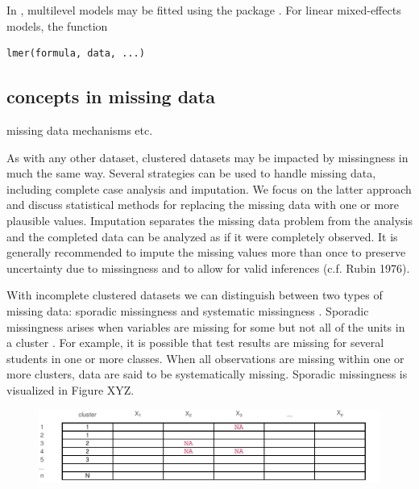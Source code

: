 \documentclass[
  article]{jss}
\begin{document}
In , multilevel models may be fitted using the package
. For linear mixed-effects models, the function

\begin{verbatim}
lmer(formula, data, ...)
\end{verbatim}

\hypertarget{concepts-in-missing-data}{%
\subsection{concepts in missing data}\label{concepts-in-missing-data}}

missing data mechanisms etc.

As with any other dataset, clustered datasets may be impacted by
missingness in much the same way. Several strategies can be used to
handle missing data, including complete case analysis and imputation. We
focus on the latter approach and discuss statistical methods for
replacing the missing data with one or more plausible values. Imputation
separates the missing data problem from the analysis and the completed
data can be analyzed as if it were completely observed. It is generally
recommended to impute the missing values more than once to preserve
uncertainty due to missingness and to allow for valid inferences (c.f.
Rubin 1976).

With incomplete clustered datasets we can distinguish between two types
of missing data: sporadic missingness and systematic missingness
\citep{resc13}. Sporadic missingness arises when variables are missing
for some but not all of the units in a cluster \citep{buur18, jola18}.
For example, it is possible that test results are missing for several
students in one or more classes. When all observations are missing
within one or more clusters, data are said to be systematically missing.
Sporadic missingness is visualized in Figure XYZ.

\begin{figure}[h]

{\centering \includegraphics{manuscript_files/figure-pdf/unnamed-chunk-3-1.pdf}

}

\end{figure}
\end{document}
